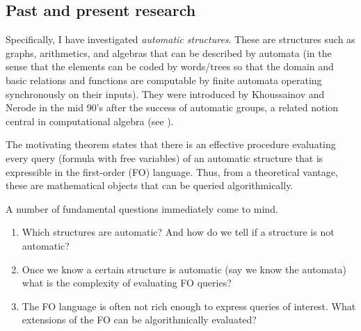 \documentclass[11pt]{article}
\theoremstyle{plain} \numberwithin{equation}{section}
\theoremstyle{definition}
\begin{document}



\begin{center} \subsection*{Past and present research}
\end{center}
\noindent
Specifically, I have investigated {\it automatic structures}. These are structures such as graphs, arithmetics, and algebras that can be described by automata (in the sense that the elements can be coded by words/trees so that the domain and basic relations and functions are computable by finite automata operating synchronously on their inputs).  They were introduced by Khoussainov and Nerode in the mid 90's after the success of automatic groups, a related notion central in computational algebra (see \cite{CEHLPT92}).

The motivating theorem states that there is an effective procedure evaluating every query (formula with free variables) of an automatic structure that is expressible in the first-order (FO) language. Thus, from a theoretical vantage, these are mathematical objects that can be queried algorithmically.

A number of fundamental questions immediately come to mind. \begin{enumerate}
\item Which structures are automatic? And how do we tell if a structure is not automatic?
\item Once we know a certain structure is automatic (say we know the automata) what is the complexity of evaluating FO queries?
\item The FO language is often not rich enough to express queries of interest. What extensions of the FO can be algorithmically evaluated?
\end{enumerate}
\end{document}
